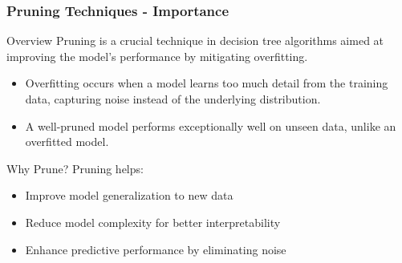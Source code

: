 \documentclass[aspectratio=169]{beamer}
\begin{document}
\begin{frame}[fragile]
    \frametitle{Pruning Techniques - Importance}

    \begin{block}{Overview}
        Pruning is a crucial technique in decision tree algorithms aimed at improving the model's performance by mitigating overfitting.
    \end{block}

    \begin{itemize}
        \item Overfitting occurs when a model learns too much detail from the training data, capturing noise instead of the underlying distribution.
        \item A well-pruned model performs exceptionally well on unseen data, unlike an overfitted model.
    \end{itemize}
    
    \begin{block}{Why Prune?}
        Pruning helps:
        \begin{itemize}
            \item Improve model generalization to new data
            \item Reduce model complexity for better interpretability
            \item Enhance predictive performance by eliminating noise
        \end{itemize}
    \end{block}

\end{frame}
\end{document}
